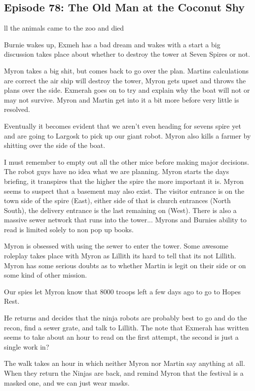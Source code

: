 \subsection{Episode 78: The Old Man at the Coconut Shy}

ll the animals came to the zoo and died\medskip

Burnie wakes up, Exmeh has a bad dream and wakes with a start a big discussion takes place about whether to destroy the tower at Seven Spires or not.\medskip

Myron takes a big shit, but comes back to go over the plan. Martins calculations are correct the air ship will destroy the tower, Myron gets upset and throws the plans over the side. Exmerah goes on to try and explain why the boat will not or may not survive. Myron and Martin get into it a bit more before very little is resolved.\medskip

Eventually it becomes evident that we aren't even heading for sevens spire yet and are going to Largosk to pick up our giant robot. Myron also kills a farmer by shitting over the side of the boat.\medskip

I must remember to empty out all the other mice before making major decisions. The robot guys have no idea what we are planning. Myron starts the days briefing, it transpires that the higher the spire the more important it is. Myron seems to suspect that a basement may also exist. The visitor entrance is on the town side of the spire (East), either side of that is church entrances (North South), the delivery entrance is the last remaining on (West). There is also a massive sewer network that runs into the tower... Myrons and Burnies ability to read is limited solely to non pop up books.\medskip

Myron is obsessed with using the sewer to enter the tower. Some awesome roleplay takes place with Myron as Lillith its hard to tell that its not Lillith. Myron has some serious doubts as to whether Martin is legit on their side or on some kind of other mission.\medskip

Our spies let Myron know that 8000 troops left a few days ago to go to Hopes Rest.\medskip

He returns and decides that the ninja robots are probably best to go and do the recon, find a sewer grate, and talk to Lillith. The note that Exmerah has written seems to take about an hour to read on the first attempt, the second is just a single work in?\medskip

The walk takes an hour in which neither Myron nor Martin say anything at all. When they return the Ninjas are back, and remind Myron that the festival is a masked one, and we can just wear masks.\medskip

